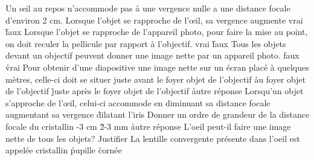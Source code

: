 \q
Un \oe il au repos 
\rv
n'accommode pas
\r
a une vergence nulle
\rv
a une distance focale d'environ 2 cm.
\q
Lorsque l'objet se rapproche de l'\oe il, sa vergence augmente
\rv
vrai
\r
faux
\q
Lorsque l'objet se rapproche de l'appareil photo, pour faire la mise au point, on doit reculer la pellicule par rapport à l'objectif.
\rv
vrai
\r
faux
\q
Tous les objets devant un objectif peuvent donner une image nette par un appareil photo.
\rv
faux
\r
vrai
\q
Pour obtenir d'une diapositive une image nette sur un écran placé à quelques mètres, celle-ci doit se situer
\rv
juste avant le foyer objet de l'objectif
\r
au foyer objet de l'objectif
\r
juste après le foyer objet de l'objectif
\r
autre réponse
\q
Lorsqu'un objet s'approche de l'\oe il, celui-ci accommode en
\rv
diminuant sa distance focale
\rv
augmentant sa vergence
\r
dilatant l'iris
\q
Donner un ordre de grandeur de la distance focale du cristallin
-3 cm
\r
2-3 mm
\r
autre réponse
\q
L'oeil peut-il faire une image nette de tous les objets? Justifier
\q
La lentille convergente présente dans l'oeil est appelée
\rv
cristallin
\r
pupille
\r
cornée
